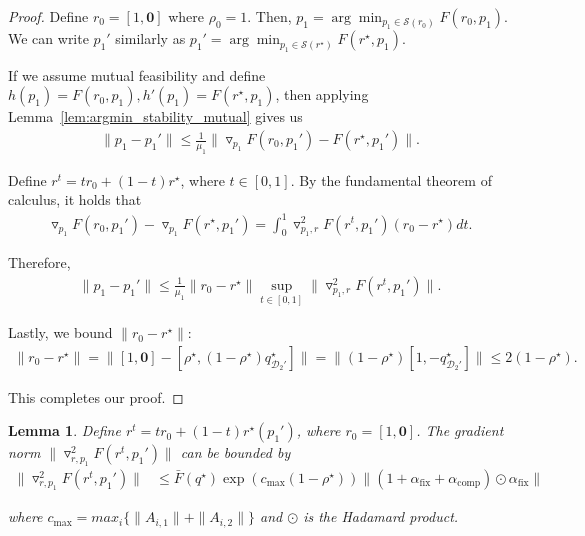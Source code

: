\documentclass[table]{ai2style/ai2}
\newtheorem{lemma}{Lemma}
\newcommand{\D}[0]{\mathcal{D}}
\newcommand{\alphafix}[0]{\alpha_{\text{fix}}}
\newcommand{\alphacomp}[0]{\alpha_{\text{comp}}}
\begin{document}
\begin{proof}
    Define $r_0 = [1, \mathbf{0}]$ where $\rho_0 = 1$. Then, $p_1 = \arg \min_{p_1 \in \mathcal{S}(r_0)} F(r_0, p_1)$. We can write $p_1'$ similarly as $p_1' = \arg \min_{p_1 \in \mathcal{S}(r^\star)} F(r^\star, p_1)$. 

    If we assume mutual feasibility and define $h(p_1) = F(r_0, p_1), h'(p_1) = F(r^\star, p_1)$, then applying Lemma~\ref{lem:argmin_stability_mutual} gives us
    \begin{align*}
        \| p_1 - p_1' \| \le \frac{1}{\mu_1} \|\triangledown_{p_1} F(r_0, p_1') - F(r^\star, p_1') \|.
    \end{align*}

    Define $r^t = t r_0 + (1 - t) r^\star$, where $t \in [0, 1]$. By the fundamental theorem of calculus, it holds that 
    \begin{align*}
        \triangledown_{p_1} F(r_0, p_1') - \triangledown_{p_1} F(r^\star, p_1') = \int_0^1 \triangledown_{p_1, r}^2 F(r^t, p_1') (r_0 - r^\star) dt.
    \end{align*}

    Therefore, 
    \begin{align*}
        \| p_1 - p_1' \| \le \frac{1}{\mu_1} \|r_0 - r^\star \| \sup_{t \in [0, 1]}  \| \triangledown_{p_1, r}^2 F(r^t, p_1') \|.
    \end{align*}

    Lastly, we bound $\|r_0 - r^\star\|$:
    \begin{align*}
        \|r_0 - r^\star\| = \|[1, \mathbf{0}] - [\rho^\star, (1 - \rho^\star) q_{\D_2'}^\star] \| = \| (1 - \rho^\star) [1, -q_{\D_2'}^\star]\| \le 2(1 - \rho^\star).
    \end{align*}

    This completes our proof.
\end{proof}

\begin{lemma}\label{lemma:grad_r_p1_add}
    Define $r^t = t r_0 + (1 - t) r^\star(p_1')$, where $r_0 = [1, \mathbf{0}]$.
    The gradient norm $\|\triangledown^2_{r,p_1}F(r^t,p_1')\|$ can be bounded by 
    \begin{align*}
       \|\triangledown^2_{r,p_1}F(r^t,p_1')\| &\le \bar{F}(q^\star) \exp( c_{\max}(1 - \rho^\star)) \|(1 + \alphafix + \alphacomp) \odot \alphafix \|
    \end{align*}
    
    where $c_{\max} = max_i \{\|A_{i, 1}\| + \|A_{i, 2}\| \}$ and $\odot$ is the Hadamard product. 
\end{lemma}
\end{document}
